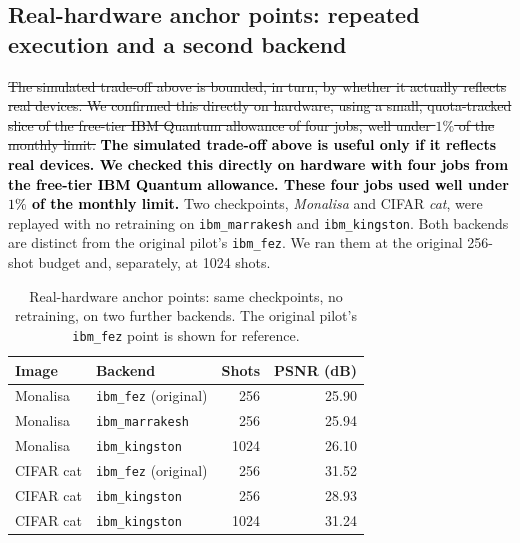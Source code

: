 \documentclass[pdflatex,sn-basic]{sn-jnl}
\newcommand{\del}[1]{\sout{#1}}
\newcommand{\add}[1]{\textbf{\textcolor{black}{#1}}}
\begin{document}
\subsection{Real-hardware anchor points: repeated execution and a second backend}
\label{sec:hardware_anchors}

\del{The simulated trade-off above is bounded, in turn, by whether it actually
reflects real devices. We confirmed this directly on hardware, using a small,
quota-tracked slice of the free-tier IBM Quantum allowance of four jobs, well
under $1\%$ of the monthly limit.} \add{The simulated trade-off above is useful
only if it reflects real devices. We checked this directly on hardware with four
jobs from the free-tier IBM Quantum allowance. These four jobs used well under
$1\%$ of the monthly limit.} Two checkpoints, \textit{Monalisa} and CIFAR
\textit{cat}, were replayed with no retraining on \texttt{ibm\_marrakesh} and
\texttt{ibm\_kingston}. Both backends are distinct from the original pilot's
\texttt{ibm\_fez}. We ran them at the original 256-shot budget and, separately,
at 1024 shots.

\begin{table}[t]
  \centering
  \caption{Real-hardware anchor points: same checkpoints, no retraining, on two
           further backends. The original pilot's \texttt{ibm\_fez} point is
           shown for reference.}
  \label{tab:hardware_anchors}
  \begin{tabular}{@{}l l r r@{}}
    \toprule
    Image       & Backend                       & Shots & PSNR (dB) \\
    \midrule
    Monalisa    & \texttt{ibm\_fez} (original)  &  256  & 25.90     \\
    Monalisa    & \texttt{ibm\_marrakesh}       &  256  & 25.94     \\
    Monalisa    & \texttt{ibm\_kingston}        & 1024  & 26.10     \\
    \addlinespace
    CIFAR cat   & \texttt{ibm\_fez} (original)  &  256  & 31.52     \\
    CIFAR cat   & \texttt{ibm\_kingston}        &  256  & 28.93     \\
    CIFAR cat   & \texttt{ibm\_kingston}        & 1024  & 31.24     \\
    \bottomrule
  \end{tabular}
\end{table}
\end{document}
